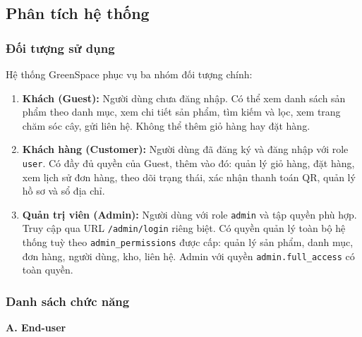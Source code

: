 \documentclass[a4paper]{article}
\begin{document}
\subsection{Phân tích hệ thống}

\subsubsection{Đối tượng sử dụng}

Hệ thống GreenSpace phục vụ ba nhóm đối tượng chính:

\begin{enumerate}
    \item \textbf{Khách (Guest):} Người dùng chưa đăng nhập. Có thể xem danh sách sản phẩm theo danh mục, xem chi tiết sản phẩm, tìm kiếm và lọc, xem trang chăm sóc cây, gửi liên hệ. Không thể thêm giỏ hàng hay đặt hàng.

    \item \textbf{Khách hàng (Customer):} Người dùng đã đăng ký và đăng nhập với role \texttt{user}. Có đầy đủ quyền của Guest, thêm vào đó: quản lý giỏ hàng, đặt hàng, xem lịch sử đơn hàng, theo dõi trạng thái, xác nhận thanh toán QR, quản lý hồ sơ và sổ địa chỉ.

    \item \textbf{Quản trị viên (Admin):} Người dùng với role \texttt{admin} và tập quyền phù hợp. Truy cập qua URL \texttt{/admin/login} riêng biệt. Có quyền quản lý toàn bộ hệ thống tuỳ theo \texttt{admin\_permissions} được cấp: quản lý sản phẩm, danh mục, đơn hàng, người dùng, kho, liên hệ. Admin với quyền \texttt{admin.full\_access} có toàn quyền.
\end{enumerate}

\subsubsection{Danh sách chức năng}

\textbf{A. End-user}
\end{document}
